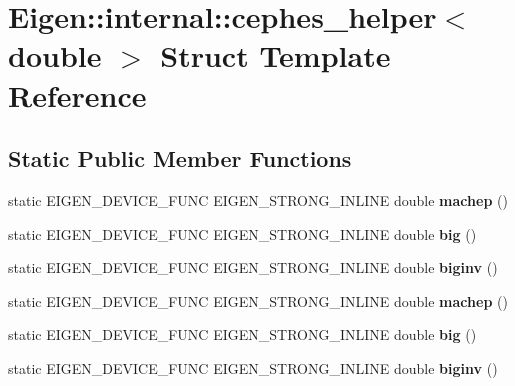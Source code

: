 \hypertarget{struct_eigen_1_1internal_1_1cephes__helper_3_01double_01_4}{}\section{Eigen\+:\+:internal\+:\+:cephes\+\_\+helper$<$ double $>$ Struct Template Reference}
\label{struct_eigen_1_1internal_1_1cephes__helper_3_01double_01_4}
\subsection*{Static Public Member Functions}
\begin{DoxyCompactItemize}
\item 
\mbox{\label{struct_eigen_1_1internal_1_1cephes__helper_3_01double_01_4_a5f6e80e7ddefe936d7d3686c14054ebc}} 
static E\+I\+G\+E\+N\+\_\+\+D\+E\+V\+I\+C\+E\+\_\+\+F\+U\+NC E\+I\+G\+E\+N\+\_\+\+S\+T\+R\+O\+N\+G\+\_\+\+I\+N\+L\+I\+NE double {\bfseries machep} ()
\item 
\mbox{\label{struct_eigen_1_1internal_1_1cephes__helper_3_01double_01_4_a4ec28d272a564ee3ad92d32dc9ad6128}} 
static E\+I\+G\+E\+N\+\_\+\+D\+E\+V\+I\+C\+E\+\_\+\+F\+U\+NC E\+I\+G\+E\+N\+\_\+\+S\+T\+R\+O\+N\+G\+\_\+\+I\+N\+L\+I\+NE double {\bfseries big} ()
\item 
\mbox{\label{struct_eigen_1_1internal_1_1cephes__helper_3_01double_01_4_aa38499701bf6cf8d2a2b4da5817f9111}} 
static E\+I\+G\+E\+N\+\_\+\+D\+E\+V\+I\+C\+E\+\_\+\+F\+U\+NC E\+I\+G\+E\+N\+\_\+\+S\+T\+R\+O\+N\+G\+\_\+\+I\+N\+L\+I\+NE double {\bfseries biginv} ()
\item 
\mbox{\label{struct_eigen_1_1internal_1_1cephes__helper_3_01double_01_4_a5f6e80e7ddefe936d7d3686c14054ebc}} 
static E\+I\+G\+E\+N\+\_\+\+D\+E\+V\+I\+C\+E\+\_\+\+F\+U\+NC E\+I\+G\+E\+N\+\_\+\+S\+T\+R\+O\+N\+G\+\_\+\+I\+N\+L\+I\+NE double {\bfseries machep} ()
\item 
\mbox{\label{struct_eigen_1_1internal_1_1cephes__helper_3_01double_01_4_a4ec28d272a564ee3ad92d32dc9ad6128}} 
static E\+I\+G\+E\+N\+\_\+\+D\+E\+V\+I\+C\+E\+\_\+\+F\+U\+NC E\+I\+G\+E\+N\+\_\+\+S\+T\+R\+O\+N\+G\+\_\+\+I\+N\+L\+I\+NE double {\bfseries big} ()
\item 
\mbox{\label{struct_eigen_1_1internal_1_1cephes__helper_3_01double_01_4_aa38499701bf6cf8d2a2b4da5817f9111}} 
static E\+I\+G\+E\+N\+\_\+\+D\+E\+V\+I\+C\+E\+\_\+\+F\+U\+NC E\+I\+G\+E\+N\+\_\+\+S\+T\+R\+O\+N\+G\+\_\+\+I\+N\+L\+I\+NE double {\bfseries biginv} ()
\end{DoxyCompactItemize}


